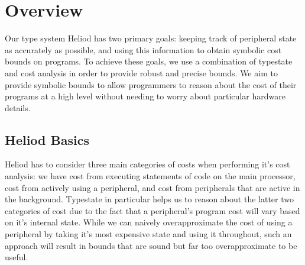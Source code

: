 \section{Overview}



Our type system Heliod has two primary goals: keeping track of peripheral state as accurately as possible, and using this information to obtain symbolic cost bounds on programs. To achieve these goals, we use a combination of typestate and cost analysis in order to provide robust and precise bounds. We aim to provide symbolic bounds to allow programmers to reason about the cost of their programs at a high level without needing to worry about particular hardware details. 

\subsection{Heliod Basics}
Heliod has to consider three main categories of costs when performing it's cost analysis: we have cost from executing statements of code on the main processor, cost from actively using a peripheral, and cost from peripherals that are active in the background. Typestate in particular helps us to reason about the latter two categories of cost due to the fact that a peripheral's program cost will vary based on it's internal state. While we can naively overapproximate the cost of using a peripheral by taking it's most expensive state and using it throughout, such an approach will result in bounds that are sound but far too overapproximate to be useful. 
